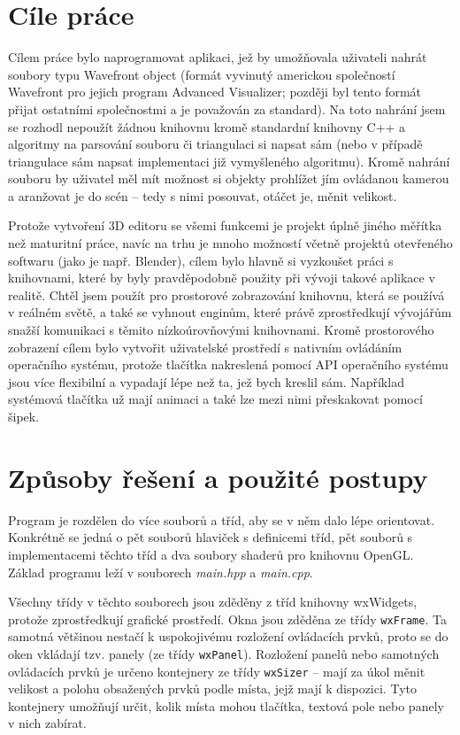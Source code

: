 \documentclass[a4paper, 12pt]{report}
\begin{document}
\section{Cíle práce}
Cílem práce bylo naprogramovat aplikaci, jež by umožňovala uživateli nahrát soubory typu Wavefront object (formát vyvinutý americkou společností Wavefront pro jejich program Advanced Visualizer\cite{wiki:obj}; později byl tento formát přijat ostatními společnostmi a je považován za standard). Na toto nahrání jsem se rozhodl nepoužít žádnou knihovnu kromě standardní knihovny C++ a algoritmy na parsování souboru či triangulaci si napsat sám (nebo v případě triangulace sám napsat implementaci již vymyšleného algoritmu). Kromě nahrání souboru by uživatel měl mít možnost si objekty prohlížet jím ovládanou kamerou a aranžovat je do scén -- tedy s nimi posouvat, otáčet je, měnit velikost.

Protože vytvoření 3D editoru se všemi funkcemi je projekt úplně jiného měřítka než maturitní práce, navíc na trhu je mnoho možností včetně projektů otevřeného softwaru (jako je např. Blender), cílem bylo hlavně si vyzkoušet práci s knihovnami, které by byly pravděpodobně použity při vývoji takové aplikace v realitě. Chtěl jsem použít pro prostorové zobrazování knihovnu, která se používá v reálném světě, a také se vyhnout enginům, které právě zprostředkují vývojářům snažší komunikaci s těmito nízkoúrovňovými knihovnami. Kromě prostorového zobrazení cílem bylo vytvořit uživatelské prostředí s nativním ovládáním operačního systému, protože tlačítka nakreslená pomocí API operačního systému jsou více flexibilní a vypadají lépe než ta, jež bych kreslil sám. Například systémová tlačítka už mají animaci a také lze mezi nimi přeskakovat pomocí šipek.

\section{Způsoby řešení a použité postupy}
Program je rozdělen do více souborů a tříd, aby se v něm dalo lépe orientovat. Konkrétně se jedná o pět souborů hlaviček s definicemi tříd, pět souborů s implementacemi těchto tříd a dva soubory shaderů pro knihovnu OpenGL. Základ programu leží v souborech \emph{main.hpp} a \emph{main.cpp}.

Všechny třídy v těchto souborech jsou zděděny z tříd knihovny wxWidgets, protože zprostředkují grafické prostředí. Okna jsou zděděna ze třídy \texttt{wxFrame}. Ta samotná většinou nestačí k uspokojivému rozložení ovládacích prvků, proto se do oken vkládají tzv. panely (ze třídy \texttt{wxPanel}). Rozložení panelů nebo samotných ovládacích prvků je určeno kontejnery ze třídy \texttt{wxSizer} -- mají za úkol měnit velikost a polohu obsažených prvků podle místa, jejž mají k dispozici. Tyto kontejnery umožňují určit, kolik místa mohou tlačítka, textová pole nebo panely v nich zabírat.
\end{document}
